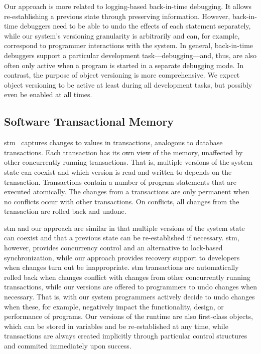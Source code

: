 Our approach is more related to logging-based back-in-time debugging.
It allows re-establishing a previous state through preserving information.
However, back-in-time debuggers need to be able to undo the effects of each statement separately, while our system's versioning granularity is arbitrarily and can, for example, correspond to programmer interactions with the system.
In general, back-in-time debuggers support a particular development task---debugging---and, thus, are also often only active when a program is started in a separate debugging mode.
In contrast, the purpose of object versioning is more comprehensive.
We expect object versioning to be active at least during all development tasks, but possibly even be enabled at all times.


\subsection{Software Transactional Memory}

\ac{stm}~\cite{Shavit1995STM} captures changes to values in transactions, analogous to database transactions.
Each transaction has its own view of the memory, unaffected by other concurrently running transactions.
That is, multiple versions of the system state can coexist and which version is read and written to depends on the transaction.
Transactions contain a number of program statements that are executed atomically.
The changes from a transactions are only permanent when no conflicts occur with other transactions.
On conflicts, all changes from the transaction are rolled back and undone.

\ac{stm} and our approach are similar in that multiple versions of the system state can coexist and that a previous state can be re-established if necessary.
\ac{stm}, however, provides concurrency control and an alternative to lock-based synchronization, while our approach provides recovery support to developers when changes turn out be inappropriate.
\ac{stm} transactions are automatically rolled back when changes conflict with changes from other concurrently running transactions, while our versions are offered to programmers to undo changes when necessary.
That is, with our system programmers actively decide to undo changes when these, for example, negatively impact the functionality, design, or performance of programs. 
Our versions of the runtime are also first-class objects, which can be stored in variables and be re-established at any time, while transactions are always created implicitly through particular control structures and commited immediately upon success.



